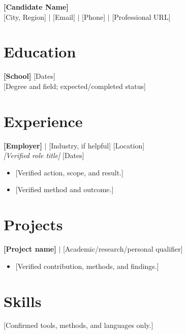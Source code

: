 \documentclass[10pt,letterpaper]{article}
\begin{document}
\begin{center}
{\LARGE\bfseries [Candidate Name]}\\
{[City, Region] $|$ [Email] $|$ [Phone] $|$ [Professional URL]}
\end{center}
\section*{Education}
\textbf{[School]} \hfill [Dates]\\
{[Degree and field; expected/completed status]}
\section*{Experience}
\textbf{[Employer]} $|$ [Industry, if helpful] \hfill [Location]\\
\textit{[Verified role title]} \hfill [Dates]
\begin{itemize}
\item {[Verified action, scope, and result.]}
\item {[Verified method and outcome.]}
\end{itemize}
\section*{Projects}
\textbf{[Project name]} $|$ [Academic/research/personal qualifier]
\begin{itemize}
\item {[Verified contribution, methods, and findings.]}
\end{itemize}
\section*{Skills}
[Confirmed tools, methods, and languages only.]
\end{document}
